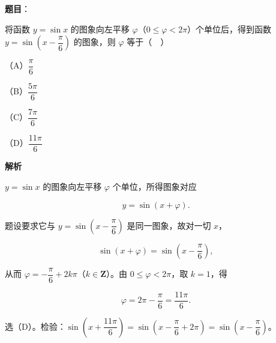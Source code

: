 \begin{answer}

\textbf{题目}：

将函数 $y=\sin x$ 的图象向左平移 $\varphi$（$0\leqslant\varphi<2\pi$）个单位后，得到函数 $y=\sin\left(x-\dfrac\pi6\right)$ 的图象，则 $\varphi$ 等于（　）

（A）$\dfrac\pi6$

（B）$\dfrac{5\pi}6$

（C）$\dfrac{7\pi}6$

（D）$\dfrac{11\pi}6$

\textbf{解析}

$y=\sin x$ 的图象向左平移 $\varphi$ 个单位，所得图象对应

\nopagebreak[4]
\[y=\sin(x+\varphi).\]

题设要求它与 $y=\sin\left(x-\dfrac\pi6\right)$ 是同一图象，故对一切 $x$，

\nopagebreak[4]
\[\sin(x+\varphi)=\sin\left(x-\frac\pi6\right),\]

从而 $\varphi=-\dfrac\pi6+2k\pi$（$k\in\mathbf Z$）。由 $0\leqslant\varphi<2\pi$，取 $k=1$，得

\nopagebreak[4]
\[\varphi=2\pi-\frac\pi6=\frac{11\pi}6.\]

选（D）。检验：$\sin\left(x+\dfrac{11\pi}6\right)=\sin\left(x-\dfrac\pi6+2\pi\right)=\sin\left(x-\dfrac\pi6\right)$。


\end{answer}
